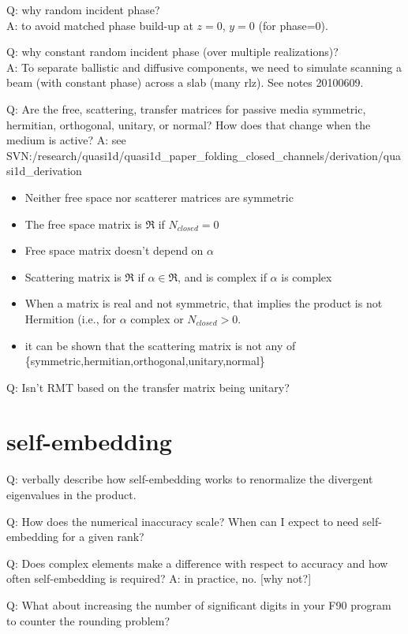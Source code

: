 \documentclass[12pt]{report} %
\begin{document}
Q: why random incident phase?\\
A: to avoid matched phase build-up at $z=0$, $y=0$ (for phase=0).

Q: why constant random incident phase (over multiple realizations)?\\
A: To separate ballistic and diffusive components, we need to simulate scanning a beam (with constant phase) across a slab (many rlz). See notes 20100609.

Q: Are the free, scattering, transfer matrices for passive media symmetric, hermitian, orthogonal, unitary, or normal? How does that change when the medium is active?
A: see SVN:/research/quasi1d/quasi1d\_paper\_folding\_closed\_channels/derivation/quasi1d\_derivation \\
\begin{itemize}
\item Neither free space nor scatterer matrices are symmetric
\item The free space matrix is $\Re$ if $N_{closed}=0$
\item Free space matrix doesn't depend on $\alpha$
\item Scattering matrix is $\Re$ if $\alpha \in \Re$, and is complex if $\alpha$ is complex
\item When a matrix is real and not symmetric, that implies the product is not Hermition (i.e., for $\alpha$ complex or $N_{closed}>0$.
\item it can be shown that the scattering matrix is not any of \{symmetric,hermitian,orthogonal,unitary,normal\}
\end{itemize}

Q: Isn't RMT based on the transfer matrix being unitary?

\section{self-embedding}
Q: verbally describe how self-embedding works to renormalize the divergent eigenvalues in the product.

Q: How does the numerical inaccuracy scale? When can I expect to need self-embedding for a given rank? 

Q: Does complex elements make a difference with respect to accuracy and how often self-embedding is required?  
A: in practice, no. [why not?]

Q: What about increasing the number of significant digits in your F90 program to counter the rounding problem?
\end{document}
